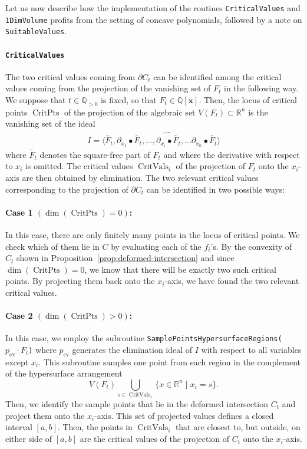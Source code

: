 \documentclass[sigconf, nonacm]{acmart} %
\newcommand{\critPts}[0]{{\operatorname{CritPts}}}
\newcommand{\critVals}[0]{{\operatorname{CritVals}}}
\begin{document}
Let us now describe how the implementation of the routines \texttt{CriticalValues} and \texttt{1DimVolume} profits from the setting of concave polynomials, followed by a note on \texttt{SuitableValues}.

\paragraph{\texttt{CriticalValues}}
The two critical values coming from $\partial C_t$ can
be identified among the critical values coming from the projection
of the vanishing set of $F_t$ in the following way. We suppose that $t \in \mathbb{Q}_{>0}$ is fixed, so that $F_t \in \mathbb{Q}[\mathbf{x}]$. Then,  
the locus of critical points $\critPts$ of the projection of the algebraic set $V(F_t) \subset \mathbb{R}^n$ is the vanishing set of the ideal 
\begin{align}
    I = \langle \tilde{F_t}, \partial_{x_1}\bullet \tilde{F_t}, \dots, \widehat{\partial_{x_i}\bullet \tilde{F_t}}, \ldots \partial_{x_n}\bullet \tilde{F_t} \rangle
\end{align}
where $\tilde{F_t}$ denotes the square-free part of $F_t$ and where
the derivative with respect to $x_i$ is omitted. The critical values $\critVals_i$ of the projection of $F_t$ onto the $x_i$-axis are then obtained by elimination. The two relevant critical values corresponding to the projection of $\partial C_t$ can be identified in two possible ways:

\paragraph{Case 1 $(\dim(\critPts) = 0)$:} In this case, there are only finitely many points in the locus of critical points. We check which of them lie in $C$ by evaluating each of the $f_i$'s. By the convexity of $C_t$ shown in Proposition~\ref{prop:deformed-intersection} and since $\dim(\critPts) = 0$, we know that there will be exactly two such critical points. By projecting them back onto the $x_i$-axis, we have found the two relevant critical values.

\paragraph{Case 2 $(\operatorname{dim}(\critPts)>0)$:} 
In this case, we employ the subroutine \texttt{SamplePointsHypersurfaceRegions($p_{\text{cv}}\cdot F_t$)} where $p_{\text{cv}}$ generates the elimination ideal of $I$ with respect to all variables except $x_i$. This subroutine samples one point from each region in the complement of the hypersurface arrangement 
\begin{equation}
      V(F_t) \bigcup_{s \in \critVals_i}\{x \in \mathbb R^n \mid x_i = s\}.
\end{equation} Then, we identify the sample points that lie in the deformed intersection $C_t$ and project them onto the $x_i$-axis. This set of projected values defines a closed interval $[a,b]$. Then, the points in $\critVals_i$ that are closest to, but outside, on either side of $[a,b]$ are the critical values of the projection of $C_t$ onto the $x_i$-axis. 
\end{document}

